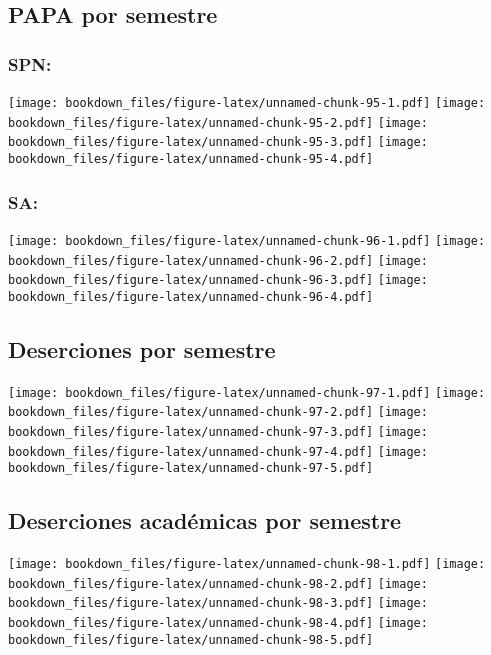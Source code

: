 \documentclass[]{article}
\theoremstyle{definition}
\theoremstyle{definition}
\theoremstyle{definition}
\theoremstyle{remark}
\begin{document}
\subsection{PAPA por semestre}\label{papa-por-semestre-1}

\subsubsection{SPN:}\label{spn-4}

\texttt{[image: bookdown\_files/figure-latex/unnamed-chunk-95-1.pdf]}
\texttt{[image: bookdown\_files/figure-latex/unnamed-chunk-95-2.pdf]}
\texttt{[image: bookdown\_files/figure-latex/unnamed-chunk-95-3.pdf]}
\texttt{[image: bookdown\_files/figure-latex/unnamed-chunk-95-4.pdf]}

\subsubsection{SA:}\label{sa-4}

\texttt{[image: bookdown\_files/figure-latex/unnamed-chunk-96-1.pdf]}
\texttt{[image: bookdown\_files/figure-latex/unnamed-chunk-96-2.pdf]}
\texttt{[image: bookdown\_files/figure-latex/unnamed-chunk-96-3.pdf]}
\texttt{[image: bookdown\_files/figure-latex/unnamed-chunk-96-4.pdf]}

\subsection{Deserciones por semestre}\label{deserciones-por-semestre-1}

\texttt{[image: bookdown\_files/figure-latex/unnamed-chunk-97-1.pdf]}
\texttt{[image: bookdown\_files/figure-latex/unnamed-chunk-97-2.pdf]}
\texttt{[image: bookdown\_files/figure-latex/unnamed-chunk-97-3.pdf]}
\texttt{[image: bookdown\_files/figure-latex/unnamed-chunk-97-4.pdf]}
\texttt{[image: bookdown\_files/figure-latex/unnamed-chunk-97-5.pdf]}

\subsection{Deserciones académicas por
semestre}\label{deserciones-academicas-por-semestre-1}

\texttt{[image: bookdown\_files/figure-latex/unnamed-chunk-98-1.pdf]}
\texttt{[image: bookdown\_files/figure-latex/unnamed-chunk-98-2.pdf]}
\texttt{[image: bookdown\_files/figure-latex/unnamed-chunk-98-3.pdf]}
\texttt{[image: bookdown\_files/figure-latex/unnamed-chunk-98-4.pdf]}
\texttt{[image: bookdown\_files/figure-latex/unnamed-chunk-98-5.pdf]}
\end{document}

